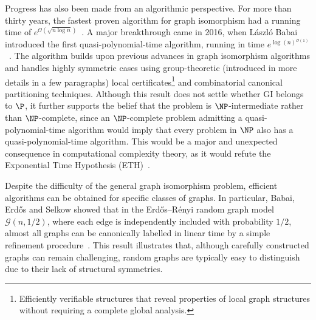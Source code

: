Progress has also been made from an algorithmic perspective. For more than thirty years, the fastest proven algorithm for graph isomorphism had a running time of 
$e^{\mathcal{O}(\sqrt{n \log n})}$~\cite{babai1983computational}. 
A major breakthrough came in 2016, when László Babai introduced the first quasi-polynomial-time algorithm, running in time 
$e^{\log(n){}^{\mathcal{O}(1)}}$~\cite{babai2016graph}. 
The algorithm builds upon previous advances in graph isomorphism algorithms and handles highly symmetric cases using group-theoretic (introduced in more details in a few paragraphs) local certificates\footnote{Efficiently verifiable structures that reveal properties of local graph structures without requiring a complete global analysis.} and combinatorial canonical partitioning techniques. 
Although this result does not settle whether GI belongs to $\P$, it further supports the belief that the problem is $\NP$-intermediate rather than $\NP$-complete, since an $\NP$-complete problem admitting a quasi-polynomial-time algorithm would imply that every problem in $\NP$ also has a quasi-polynomial-time algorithm. This would be a major and unexpected consequence in computational complexity theory, as it would refute the Exponential Time Hypothesis (ETH)~\cite{impagliazzo2001complexity}.

Despite the difficulty of the general graph isomorphism problem, efficient algorithms can be obtained for specific classes of graphs. In particular, Babai, Erdős and Selkow showed that in the Erdős–Rényi random graph model $\mathcal{G}(n,1/2)$, where each edge is independently included with probability $1/2$, almost all graphs can be canonically labelled in linear time by a simple refinement procedure~\cite{babai1980random}. This result illustrates that, although carefully constructed graphs can remain challenging, random graphs are typically easy to distinguish due to their lack of structural symmetries.


